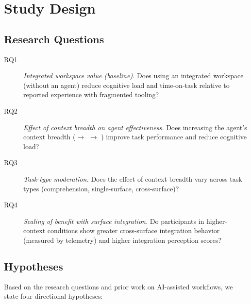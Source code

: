 \section{Study Design}
\label{sec:study}

\subsection{Research Questions}
\label{sec:study:rqs}

\begin{description}
  \item[RQ1] \emph{Integrated workspace value (baseline).}
    Does using an integrated workspace (without an agent) reduce cognitive load
    and time-on-task relative to reported experience with fragmented tooling?

  \item[RQ2] \emph{Effect of context breadth on agent effectiveness.}
    Does increasing the agent's context breadth (\CI $\to$ \CII $\to$ \CIII)
    improve task performance and reduce cognitive load?

  \item[RQ3] \emph{Task-type moderation.}
    Does the effect of context breadth vary across task types (comprehension,
    single-surface, cross-surface)?

  \item[RQ4] \emph{Scaling of benefit with surface integration.}
    Do participants in higher-context conditions show greater cross-surface
    integration behavior (measured by telemetry) and higher integration
    perception scores?
\end{description}

\subsection{Hypotheses}
\label{sec:study:hypotheses}

Based on the research questions and prior work on AI-assisted workflows, we
state four directional hypotheses:

